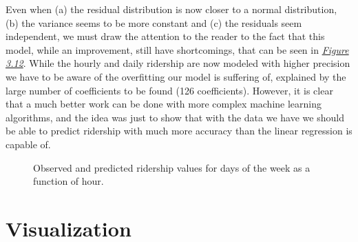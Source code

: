 \documentclass[a4paper,12pt,english]{sphinxmanual}
\begin{document}
Even when (a) the residual distribution is now closer to a normal distribution,
(b) the variance seems to be more constant and (c) the residuals seem
independent, we must draw the attention to the reader to the fact that this
model, while an improvement, still have shortcomings, that can be seen in
{\hyperref[section2:figure312]{\emph{Figure 3.12}}}. While the hourly and daily ridership are now
modeled with higher precision we have to be aware of the overfitting our model
is suffering of, explained by the large number of coefficients to be found
(126 coefficients). However, it is clear that a much better work can be done
with more complex machine learning algorithms, and the idea was just to show
that with the data we have we should be able to predict ridership with much more
accuracy than the linear regression is capable of.
\begin{figure}[htbp]
\centering
\capstart

\caption{Observed and predicted ridership values for days of the week as a function of
hour.}\label{section2:figure312}\end{figure}


\chapter{Visualization}
\label{section3:visualization}\label{section3::doc}
\end{document}

